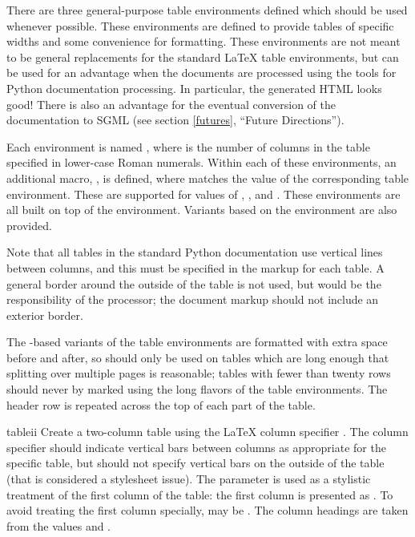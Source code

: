 \documentclass{howto}
\begin{document}
    There are three general-purpose table environments defined which
    should be used whenever possible.  These environments are defined
    to provide tables of specific widths and some convenience for
    formatting.  These environments are not meant to be general
    replacements for the standard \LaTeX{} table environments, but can
    be used for an advantage when the documents are processed using
    the tools for Python documentation processing.  In particular, the
    generated HTML looks good!  There is also an advantage for the
    eventual conversion of the documentation to SGML (see section
    \ref{futures}, ``Future Directions'').

    Each environment is named , where 
    is the number of columns in the table specified in lower-case
    Roman numerals.  Within each of these environments, an additional
    macro, , is defined, where 
    matches the  value of the corresponding table
    environment.  These are supported for  values of
    , , and .  These environments are all
    built on top of the  environment.  Variants based on
    the  environment are also provided.

    Note that all tables in the standard Python documentation use
    vertical lines between columns, and this must be specified in the
    markup for each table.  A general border around the outside of the
    table is not used, but would be the responsibility of the
    processor; the document markup should not include an exterior
    border.

    The -based variants of the table environments are
    formatted with extra space before and after, so should only be
    used on tables which are long enough that splitting over multiple
    pages is reasonable; tables with fewer than twenty rows should
    never by marked using the long flavors of the table environments.
    The header row is repeated across the top of each part of the
    table.

    \begin{envdesc}{tableii}{}
      Create a two-column table using the \LaTeX{} column specifier
      .  The column specifier should indicate vertical
      bars between columns as appropriate for the specific table, but
      should not specify vertical bars on the outside of the table
      (that is considered a stylesheet issue).  The 
      parameter is used as a stylistic treatment of the first column
      of the table: the first column is presented as
      .  To avoid treating the first
      column specially,  may be .  The
      column headings are taken from the values  and
      .
    \end{envdesc}
\end{document}
